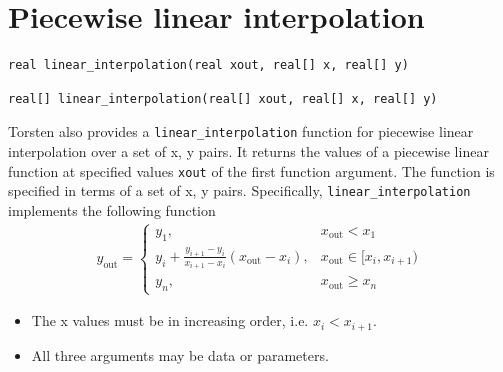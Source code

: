 \documentclass[11pt, reqno, oneside]{amsbook}
\numberwithin{equation}{chapter}
\numberwithin{figure}{chapter}
\numberwithin{table}{chapter}
\theoremstyle{remark}
\begin{document}
\section{Piecewise linear interpolation}
\label{sec:org84a2664}
\begin{verbatim}
real linear_interpolation(real xout, real[] x, real[] y)
\end{verbatim}
\begin{verbatim}
real[] linear_interpolation(real[] xout, real[] x, real[] y)
\end{verbatim}
Torsten also provides a \texttt{linear\_interpolation} function for piecewise linear interpolation over a
set of x, y pairs. It returns the values of a piecewise linear
function at specified values \texttt{xout} of the first function argument. The
function is specified in terms of a set of x, y
pairs. Specifically, \texttt{linear\_interpolation} implements the following function
\begin{align*}
  y_{\text{out}} = \left\{\begin{array}{ll}
                 y_1, & x_{\text{out}} < x_1 \\
                 y_i + \frac{y_{i+1} - y_i}{x_{i+1} - x_i}
                 \left(x_{\text{out}} - x_i\right), & x_{\text{out}} \in [x_i, x_{i+1}) \\
                 y_n, & x_{\text{out}} \ge x_n 
                          \end{array}\right.
\end{align*}
\begin{itemize}
\item The x values must be in increasing order, i.e. \(x_i < x_{i+1}\).
\item All three arguments may be data or parameters.
\end{itemize}
\end{document}
